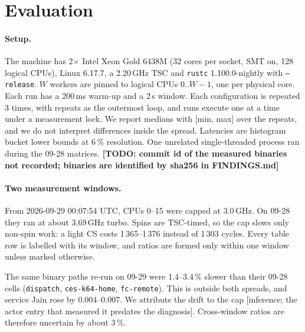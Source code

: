 \documentclass[10pt,twocolumn]{article}
\newcommand{\lk}[1]{\texttt{#1}}
\newcommand{\todo}[1]{{\color{red}\textbf{[TODO: #1]}}}
\begin{document}
\begin{table}[t]
\centering\footnotesize
{}
\caption{Lines of Rust: non-blank, non-comment lines, with lines from the
  first \lk{\#[cfg(test)]} on counted as tests. Counted by
  \lk{make\_tables.py}.}
\label{tab:loc}
\end{table}

\section{Evaluation}\label{sec:eval}

\paragraph{Setup.} The machine has 2$\times$ Intel Xeon Gold 6438M (32 cores
per socket, SMT on, 128 logical CPUs), Linux 6.17.7, a 2.20\,GHz TSC and
\lk{rustc} 1.100.0-nightly with \lk{--release}. $W$ workers are pinned to
logical CPUs $0..W{-}1$, one per physical core. Each run has a 200\,ms warm-up
and a 2\,s window. Each configuration is repeated 3 times, with repeats as the
outermost loop, and runs execute one at a time under a measurement lock. We
report medians with [min, max] over the repeats, and we do not interpret
differences inside the spread. Latencies are histogram bucket lower bounds at
6\,\% resolution. One unrelated single-threaded process ran during the 09-28
matrices. \todo{commit id of the measured binaries not recorded; binaries are
identified by sha256 in FINDINGS.md}

\paragraph{Two measurement windows.}
From 2026-09-29 00:07:54 UTC, CPUs 0--15 were capped at 3.0\,GHz. On 09-28
they ran at about 3.69\,GHz turbo. Spins are TSC-timed, so the cap slows only
non-spin work: a light CS costs 1\,365--1\,376 instead of 1\,303 cycles. Every
table row is labelled with its window, and ratios are formed only within one
window unless marked otherwise.

The same binary paths re-run on 09-29 were 1.4--3.4\,\% slower than their
09-28 cells (\lk{dispatch}, \lk{ces-k64-home}, \lk{fc-remote}). This is
outside both spreads, and service Jain rose by 0.004--0.007. We attribute the
drift to the cap [inference; the actor entry that measured it predates the
diagnosis]. Cross-window ratios are therefore uncertain by about 3\,\%.
\end{document}
